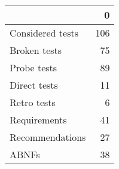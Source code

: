 \begin{tabular}{lr}
\toprule
{} &    0 \\
\midrule
Considered tests &  106 \\
Broken tests     &   75 \\
Probe tests      &   89 \\
Direct tests     &   11 \\
Retro tests      &    6 \\
Requirements     &   41 \\
Recommendations  &   27 \\
ABNFs            &   38 \\
\bottomrule
\end{tabular}

